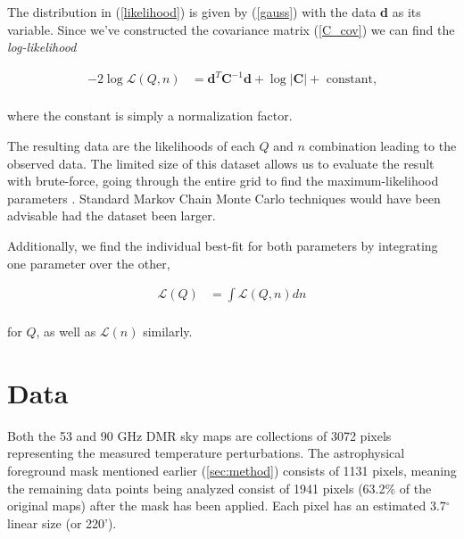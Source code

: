 \documentclass{emulateapj}
\begin{document}
The distribution in (\ref{likelihood}) is given by (\ref{gauss}) with the data \textbf{d} as its variable. Since we've constructed the covariance matrix (\ref{C_cov}) we can find the \textit{log-likelihood} 

 
\begin{equation}
\label{lnL}
\begin{array}{rl}
-2\log\mathcal{L}(Q,n) &= \textbf{d}^T\textbf{C}^{-1}\textbf{d} + \log|\textbf{C}| + \text{ constant,}  \\ 
\end{array}
\end{equation}

\noindent 
where the constant is simply a normalization factor.

The resulting data are the likelihoods of each $Q$ and $n$ combination leading to the observed data. The limited size of this dataset allows us to evaluate the result with brute-force, going through the entire grid to find the maximum-likelihood parameters%
. Standard Markov Chain Monte Carlo techniques would have been advisable had the dataset been larger.

Additionally, we find the individual best-fit for both parameters by integrating one parameter over the other,

\begin{equation}
\label{lQ}
\begin{array}{rl}
\mathcal{L}(Q) &= \int \mathcal{L}(Q,n)dn  \\ 
\end{array}
\end{equation}  

\noindent 
for $Q$, as well as $\mathcal{L}(n)$ similarly.

 

\section{Data}
\label{sec:data}


Both the 53 and 90 GHz DMR sky maps are collections of 3072 pixels representing the measured temperature perturbations. The astrophysical foreground mask mentioned earlier (\ref{sec:method}) consists of 1131 pixels, meaning the remaining data points being analyzed consist of 1941 pixels (63.2\% of the original maps) after the mask has been applied. Each pixel has an estimated 3.7$^{\circ}$ linear size (or 220’).
\end{document}

